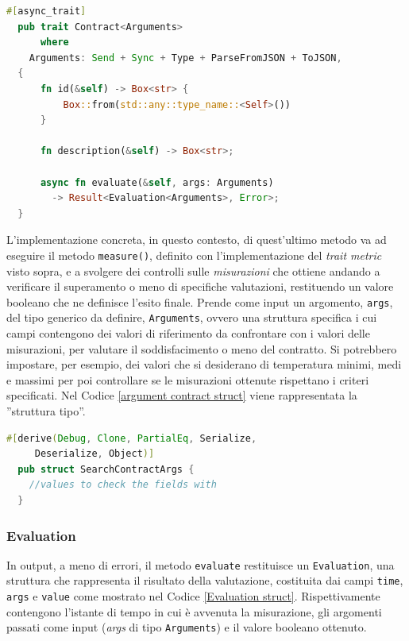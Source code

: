 \begin{lstlisting}[language=Rust, caption= Contract Trait \label{trait contract}, basicstyle=\ttfamily ]
  #[async_trait]
  pub trait Contract<Arguments>
      where
    Arguments: Send + Sync + Type + ParseFromJSON + ToJSON,
  {
      fn id(&self) -> Box<str> {
          Box::from(std::any::type_name::<Self>())
      }

      fn description(&self) -> Box<str>;

      async fn evaluate(&self, args: Arguments)
        -> Result<Evaluation<Arguments>, Error>;
  }
\end{lstlisting}

L'implementazione concreta, in questo contesto, di quest'ultimo metodo va ad eseguire il metodo \texttt{measure()}, definito con l'implementazione del \emph{trait metric} visto sopra, e a svolgere dei controlli sulle \emph{misurazioni} che ottiene andando a verificare il superamento o meno di specifiche valutazioni, restituendo un valore booleano che ne definisce l'esito finale.
Prende come input un argomento, \texttt{args}, del tipo generico da definire,
\texttt{Arguments}, ovvero una struttura specifica i cui campi contengono dei valori di riferimento da confrontare con i valori delle misurazioni, per valutare il soddisfacimento o meno del contratto. Si potrebbero impostare, per esempio, dei valori che si desiderano di temperatura minimi, medi e massimi per poi controllare se le misurazioni ottenute rispettano i criteri specificati.
Nel Codice \ref{argument contract struct} viene rappresentata la ''struttura tipo''.

\begin{lstlisting}[language=Rust, caption= Argument Contract Struct\label{argument contract struct}, basicstyle=\ttfamily ]
  #[derive(Debug, Clone, PartialEq, Serialize,
     Deserialize, Object)]
  pub struct SearchContractArgs {
    //values to check the fields with
  }
\end{lstlisting}

\subsubsection{Evaluation}\label{evaluation section}
In output, a meno di errori, il metodo \texttt{evaluate} restituisce un \texttt{Evaluation}, una struttura che rappresenta il risultato della valutazione, costituita dai campi \texttt{time}, \texttt{args} e \texttt{value} come mostrato nel Codice \ref{Evaluation struct}. Rispettivamente contengono l'istante di tempo in cui è avvenuta la misurazione, gli argomenti passati come input (\textit{args} di tipo \texttt{Arguments}) e il valore booleano ottenuto.

